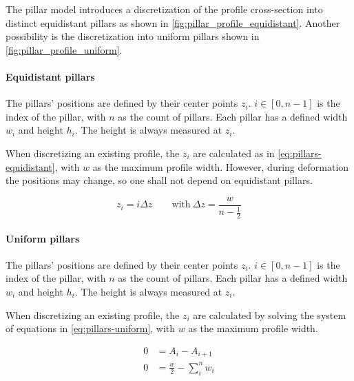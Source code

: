 \documentclass[11pt]{PyRollDocs}
\begin{document}
    The pillar model introduces a discretization of the profile cross-section into distinct equidistant pillars as shown in \autoref{fig:pillar_profile_equidistant}.
    Another possibility is the discretization into uniform pillars shown in \autoref{fig:pillar_profile_uniform}.

    \paragraph{Equidistant pillars}
    \vspace{1em}
    The pillars' positions are defined by their center points $z_i$.
    $i \in [0, n - 1]$ is the index of the pillar, with $n$ as the count of pillars.
    Each pillar has a defined width $w_i$ and height $h_i$.
    The height is always measured at $z_i$.

    When discretizing an existing profile, the $z_i$ are calculated as in \autoref{eq:pillars-equidistant}, with $w$ as the maximum profile width.
    However, during deformation the positions may change, so one shall not depend on equidistant pillars.

    \begin{equation}
        z_i = i \Delta z
        \qquad\text{with}\
        \Delta z = \frac{w}{n - \frac{1}{2}}
        \label{eq:pillars-equidistant}
    \end{equation}

    \paragraph{Uniform pillars}
    \vspace{1em}

    The pillars' positions are defined by their center points $z_i$.
    $i \in [0, n - 1]$ is the index of the pillar, with $n$ as the count of pillars.
    Each pillar has a defined width $w_i$ and height $h_i$.
    The height is always measured at $z_i$.

    When discretizing an existing profile, the $z_i$ are calculated by solving the system of equations in \autoref{eq:pillars-uniform}, with $w$ as the maximum profile width.

    \begin{equation}
        \begin{aligned}
            0 &= A_i - A_{i+1} \\
            0 &= \frac{w}{2} - \sum_{i}^{n} w_i
            \label{eq:pillars-uniform}
        \end{aligned}
    \end{equation}
\end{document}
